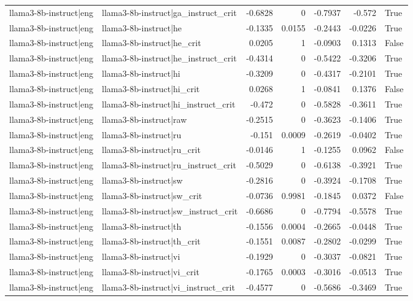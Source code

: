 \begin{table}
\begin{tabular}{l l r r r r l}
llama3-8b-instruct|eng & llama3-8b-instruct|ga_instruct_crit & -0.6828 & 0 & -0.7937 & -0.572 & True \\
llama3-8b-instruct|eng & llama3-8b-instruct|he & -0.1335 & 0.0155 & -0.2443 & -0.0226 & True \\
llama3-8b-instruct|eng & llama3-8b-instruct|he_crit & 0.0205 & 1 & -0.0903 & 0.1313 & False \\
llama3-8b-instruct|eng & llama3-8b-instruct|he_instruct_crit & -0.4314 & 0 & -0.5422 & -0.3206 & True \\
llama3-8b-instruct|eng & llama3-8b-instruct|hi & -0.3209 & 0 & -0.4317 & -0.2101 & True \\
llama3-8b-instruct|eng & llama3-8b-instruct|hi_crit & 0.0268 & 1 & -0.0841 & 0.1376 & False \\
llama3-8b-instruct|eng & llama3-8b-instruct|hi_instruct_crit & -0.472 & 0 & -0.5828 & -0.3611 & True \\
llama3-8b-instruct|eng & llama3-8b-instruct|raw & -0.2515 & 0 & -0.3623 & -0.1406 & True \\
llama3-8b-instruct|eng & llama3-8b-instruct|ru & -0.151 & 0.0009 & -0.2619 & -0.0402 & True \\
llama3-8b-instruct|eng & llama3-8b-instruct|ru_crit & -0.0146 & 1 & -0.1255 & 0.0962 & False \\
llama3-8b-instruct|eng & llama3-8b-instruct|ru_instruct_crit & -0.5029 & 0 & -0.6138 & -0.3921 & True \\
llama3-8b-instruct|eng & llama3-8b-instruct|sw & -0.2816 & 0 & -0.3924 & -0.1708 & True \\
llama3-8b-instruct|eng & llama3-8b-instruct|sw_crit & -0.0736 & 0.9981 & -0.1845 & 0.0372 & False \\
llama3-8b-instruct|eng & llama3-8b-instruct|sw_instruct_crit & -0.6686 & 0 & -0.7794 & -0.5578 & True \\
llama3-8b-instruct|eng & llama3-8b-instruct|th & -0.1556 & 0.0004 & -0.2665 & -0.0448 & True \\
llama3-8b-instruct|eng & llama3-8b-instruct|th_crit & -0.1551 & 0.0087 & -0.2802 & -0.0299 & True \\
llama3-8b-instruct|eng & llama3-8b-instruct|vi & -0.1929 & 0 & -0.3037 & -0.0821 & True \\
llama3-8b-instruct|eng & llama3-8b-instruct|vi_crit & -0.1765 & 0.0003 & -0.3016 & -0.0513 & True \\
llama3-8b-instruct|eng & llama3-8b-instruct|vi_instruct_crit & -0.4577 & 0 & -0.5686 & -0.3469 & True \\

\end{tabular}
\end{table}
